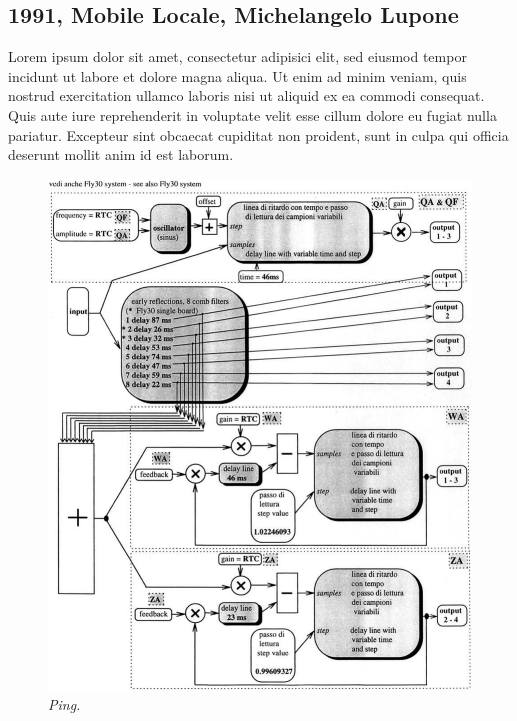 \documentclass[twoside,a4paper]{article}
\begin{document}
\subsection{1991, Mobile Locale, Michelangelo Lupone}

Lorem ipsum dolor sit amet, consectetur adipisici elit, sed eiusmod tempor
incidunt ut labore et dolore magna aliqua. Ut enim ad minim veniam, quis
nostrud exercitation ullamco laboris nisi ut aliquid ex ea commodi consequat.
Quis aute iure reprehenderit in voluptate velit esse cillum dolore eu fugiat
nulla pariatur. Excepteur sint obcaecat cupiditat non proident, sunt in culpa
qui officia deserunt mollit anim id est laborum.

\begin{figure}[ht]
\centerline{\includegraphics[scale=0.5]{img/1-comp}}
\caption{\label{fft_plot}{\it Ping.}}
\end{figure}
\end{document}
